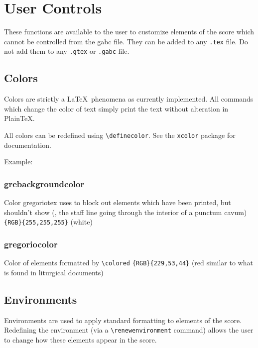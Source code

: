 \section{User Controls}

These functions are available to the user to customize elements of the
score which cannot be controlled from the gabc file. They can be added
to any \verb=.tex= file. Do not add them to any \verb=.gtex= or
\verb=.gabc= file.

\subsection{Colors}

Colors are strictly a \LaTeX\ phenomena as currently implemented.  All
commands which change the color of text simply print the text without
alteration in Plain\TeX.

All colors can be redefined using \verb=\definecolor=.  See the
\verb=xcolor= package for documentation.

Example:\par\medskip
\begin{latexcode}
\end{latexcode}

\subsubsection*{grebackgroundcolor}%
Color gregoriotex uses to block out elements which have been printed,
but shouldn't show (\eg, the staff line going through the interior of
a punctum cavum) \verb={RGB}{255,255,255}= (white)

\subsubsection*{gregoriocolor}
Color of elements formatted by \verb=\colored= \verb={RGB}{229,53,44}=
(red similar to what is found in liturgical documents)

\subsection{Environments}

Environments are used to apply standard formatting to elements of the
score.  Redefining the environment (via a \verb=\renewenvironment=
command) allows the user to change how these elements appear in the
score.

